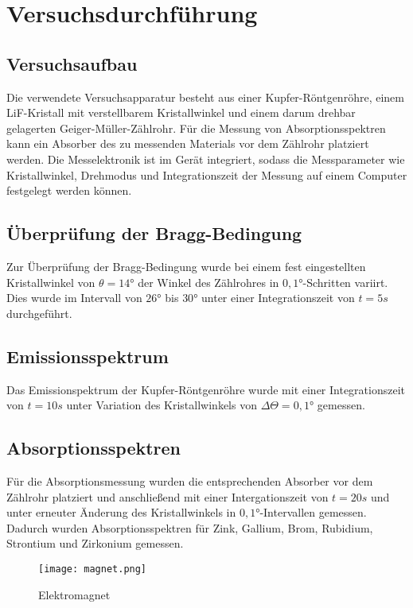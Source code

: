 \section{Versuchsdurchführung}
\subsection{Versuchsaufbau}
Die verwendete Versuchsapparatur besteht aus einer Kupfer-Röntgenröhre, einem LiF-Kristall mit verstellbarem Kristallwinkel und einem darum drehbar gelagerten Geiger-Müller-Zählrohr. Für die Messung von Absorptionsspektren kann ein Absorber des zu messenden Materials vor dem Zählrohr platziert werden. Die Messelektronik ist im Gerät integriert, sodass die Messparameter wie Kristallwinkel, Drehmodus und Integrationszeit der Messung auf einem Computer festgelegt werden können.
\subsection{Überprüfung der Bragg-Bedingung}
Zur Überprüfung der Bragg-Bedingung wurde bei einem fest eingestellten Kristallwinkel von $\theta=14°$ der Winkel des Zählrohres in $0,1°$-Schritten variirt. Dies wurde im Intervall von $26°$ bis $30°$ unter einer Integrationszeit von $t=5s$ durchgeführt.
\subsection{Emissionsspektrum}
Das Emissionspektrum der Kupfer-Röntgenröhre wurde mit einer Integrationszeit von $t=10s$ unter Variation des Kristallwinkels von $\Delta \Theta=0,1°$ gemessen.
\subsection{Absorptionsspektren}
Für die Absorptionsmessung wurden die entsprechenden Absorber vor dem Zählrohr platziert und anschließend mit einer Intergationszeit von $t=20s$ und unter erneuter Änderung des Kristallwinkels in $0,1°$-Intervallen gemessen. Dadurch wurden Absorptionsspektren für Zink, Gallium, Brom, Rubidium, Strontium und Zirkonium gemessen. 
\begin{figure}
    \centering
    \texttt{[image: magnet.png]}
    \caption{Elektromagnet}
    \label{fig:emagnet}
  \end{figure}

  
